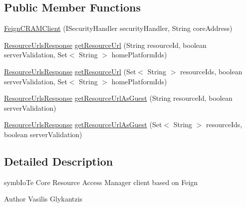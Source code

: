 \subsection*{Public Member Functions}
\begin{DoxyCompactItemize}
\item 
\hyperlink{classeu_1_1h2020_1_1symbiote_1_1client_1_1feign_1_1FeignCRAMClient_a8a0e475faf456d347391bbe000383c0d}{Feign\+C\+R\+A\+M\+Client} (I\+Security\+Handler security\+Handler, String core\+Address)
\item 
\hyperlink{classeu_1_1h2020_1_1symbiote_1_1core_1_1internal_1_1cram_1_1ResourceUrlsResponse}{Resource\+Urls\+Response} \hyperlink{classeu_1_1h2020_1_1symbiote_1_1client_1_1feign_1_1FeignCRAMClient_a81f673a86a0eae0a721872056741cbf8}{get\+Resource\+Url} (String resource\+Id, boolean server\+Validation, Set$<$ String $>$ home\+Platform\+Ids)
\item 
\hyperlink{classeu_1_1h2020_1_1symbiote_1_1core_1_1internal_1_1cram_1_1ResourceUrlsResponse}{Resource\+Urls\+Response} \hyperlink{classeu_1_1h2020_1_1symbiote_1_1client_1_1feign_1_1FeignCRAMClient_a44776204e0c03f1ec0bcced1069d550c}{get\+Resource\+Url} (Set$<$ String $>$ resource\+Ids, boolean server\+Validation, Set$<$ String $>$ home\+Platform\+Ids)
\item 
\hyperlink{classeu_1_1h2020_1_1symbiote_1_1core_1_1internal_1_1cram_1_1ResourceUrlsResponse}{Resource\+Urls\+Response} \hyperlink{classeu_1_1h2020_1_1symbiote_1_1client_1_1feign_1_1FeignCRAMClient_ae910045cbca31e3e36eb72149dced194}{get\+Resource\+Url\+As\+Guest} (String resource\+Id, boolean server\+Validation)
\item 
\hyperlink{classeu_1_1h2020_1_1symbiote_1_1core_1_1internal_1_1cram_1_1ResourceUrlsResponse}{Resource\+Urls\+Response} \hyperlink{classeu_1_1h2020_1_1symbiote_1_1client_1_1feign_1_1FeignCRAMClient_abbf69636e4cb53f646335db80c10c3ca}{get\+Resource\+Url\+As\+Guest} (Set$<$ String $>$ resource\+Ids, boolean server\+Validation)
\end{DoxyCompactItemize}


\subsection{Detailed Description}
symb\+Io\+Te Core Resource Access Manager client based on Feign

\begin{DoxyAuthor}{Author}
Vasilis Glykantzis 
\end{DoxyAuthor}


